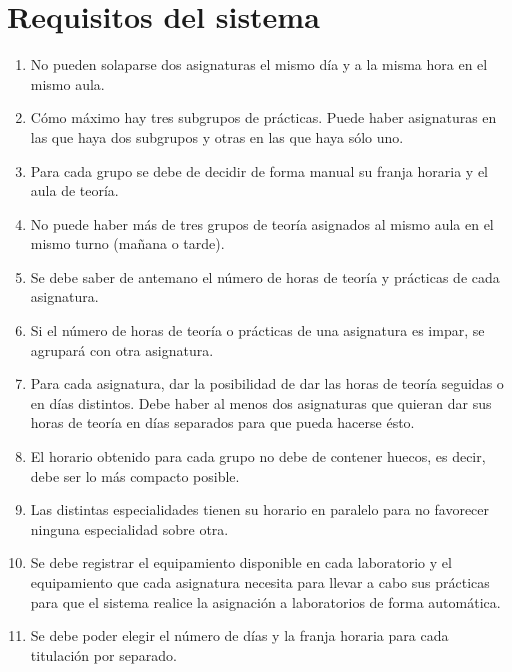 \section{Requisitos del sistema}

\begin{enumerate}[REQ-1]
    \item No pueden solaparse dos asignaturas el mismo día y a la misma hora en el mismo aula.
    \item Cómo máximo hay tres subgrupos de prácticas. Puede haber asignaturas en las que haya dos subgrupos y otras en las que haya sólo uno.
    \item Para cada grupo se debe de decidir de forma manual su franja horaria y el aula de teoría.
    \item No puede haber más de tres grupos de teoría asignados al mismo aula en el mismo turno (mañana o tarde). 
    \item Se debe saber de antemano el número de horas de teoría y prácticas de cada asignatura.
    \item Si el número de horas de teoría o prácticas de una asignatura es impar, se agrupará con otra asignatura.
    \item Para cada asignatura, dar la posibilidad de dar las horas de teoría seguidas o en días distintos. Debe haber al menos dos asignaturas que quieran dar sus horas de teoría en días separados para que pueda hacerse ésto.
    \item El horario obtenido para cada grupo no debe de contener huecos, es decir, debe ser lo más compacto posible.
    \item Las distintas especialidades tienen su horario en paralelo para no favorecer ninguna especialidad sobre otra.
    \item Se debe registrar el equipamiento disponible en cada laboratorio y el equipamiento que cada asignatura necesita para llevar a cabo sus prácticas para que el sistema realice la asignación a laboratorios de forma automática.
    \item Se debe poder elegir el número de días y la franja horaria para cada titulación por separado. 
\end{enumerate}
